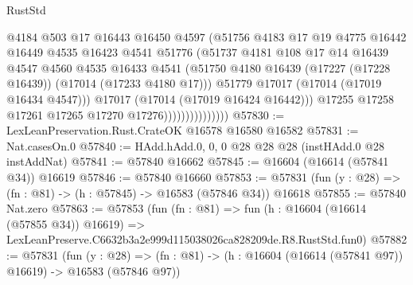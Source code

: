 \begin{lexlean}{RustStd}
\begin{coremodule}
                                  @4184
                                  @503
                                  @17
                                  @16443
                                  @16450
                                  @4597
                                  (@51756
                                    @4183
                                    @17
                                    @19
                                    @4775
                                    @16442
                                    @16449
                                    @4535
                                    @16423
                                    @4541
                                    @51776
                                    (@51737
                                      @4181
                                      @108
                                      @17
                                      @14
                                      @16439
                                      @4547
                                      @4560
                                      @4535
                                      @16433
                                      @4541
                                      (@51750
                                        @4180
                                        @16439
                                        (@17227 (@17228 @16439))
                                        (@17014 (@17233 @4180 @17)))
                                      @51779
                                      @17017
                                      (@17014 (@17019 @16434 @4547)))
                                    @17017
                                    (@17014 (@17019 @16424 @16442)))
                                  @17255
                                  @17258
                                  @17261
                                  @17265
                                  @17270
                                  @17276)))))))))))))))
@57830 := LexLeanPreservation.Rust.CrateOK @16578 @16580 @16582
@57831 := Nat.casesOn.{0}
@57840 := HAdd.hAdd.{0, 0, 0} @28 @28 @28 (instHAdd.{0} @28 instAddNat)
@57841 := @57840 @16662
@57845 := @16604 (@16614 (@57841 @34)) @16619
@57846 := @57840 @16660
@57853 := @57831 (fun (y : @28) => (fn : @81) -> (h : @57845) -> @16583 (@57846 @34)) @16618
@57855 := @57840 Nat.zero
@57863 := @57853
    (fun (fn : @81) =>
    fun (h : @16604 (@16614 (@57855 @34)) @16619) =>
    LexLeanPreserve.C6632b3a2e999d115038026ca828209de.R8.RustStd.fun0)
@57882 := @57831
    (fun (y : @28) =>
    (fn : @81) -> (h : @16604 (@16614 (@57841 @97)) @16619) -> @16583 (@57846 @97))

\end{coremodule}
\end{lexlean}
